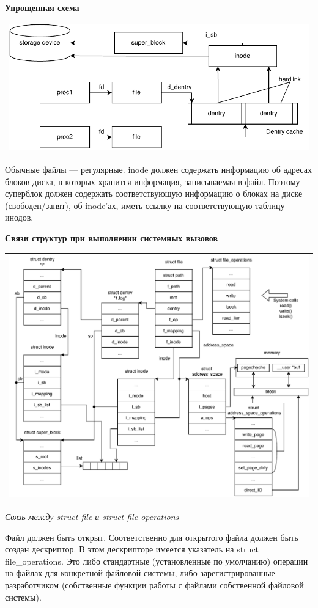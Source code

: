 \textbf{Упрощенная схема}
\begin{table}[h!]
  \centering
  \begin{tabular}{p{1\linewidth}}
    \centering
    \includegraphics[width=0.8\linewidth]{./images/struct_connect.pdf}
  \end{tabular}
\end{table}

Обычные файлы --- регулярные. inode должен содержать информацию об адресах блоков диска, в которых хранится информация, записываемая в файл. Поэтому суперблок должен содержать соответствующую информацию о блоках на диске (свободен/занят), об inode'ах, иметь ссылку на соответствующую таблицу инодов.

\textbf{Связи структур при выполнении системных вызовов}
\begin{table}[h!]
  \centering
  \begin{tabular}{p{1\linewidth}}
    \centering
    \includegraphics[width=0.8\linewidth]{./images/systemcalls_connect.pdf}
  \end{tabular}
\end{table}

\textit{Связь между struct file и struct file operations}

Файл должен быть открыт. Соответственно для открытого файла должен быть создан дескриптор. В этом дескрипторе имеется указатель на struct file\_operations. Это либо стандартные (установленные по умолчанию) операции на файлах для конкретной файловой системы, либо зарегистрированные разработчиком (собственные функции работы с файлами собственной файловой системы).

